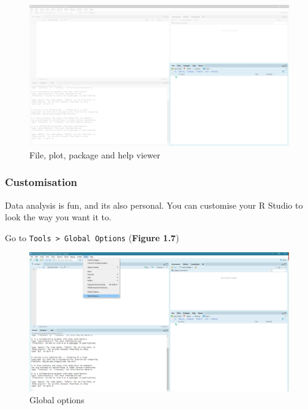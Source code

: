 \documentclass[
]{book}
\begin{document}
\begin{figure}

{\centering \includegraphics[width=24.81in]{images/02_install/rstud06} 

}

\caption{File, plot, package and help viewer}\label{fig:unnamed-chunk-14}
\end{figure}

\hypertarget{customisation}{%
\subsubsection{Customisation}\label{customisation}}

Data analysis is fun, and its also personal. You can customise your R Studio to look the way you want it to.

Go to \texttt{Tools\ \textgreater{}\ Global\ Options} (\textbf{Figure 1.7})

\begin{figure}

{\centering \includegraphics[width=25.9in]{images/02_install/rstud07} 

}

\caption{Global options}\label{fig:unnamed-chunk-15}
\end{figure}
\end{document}
